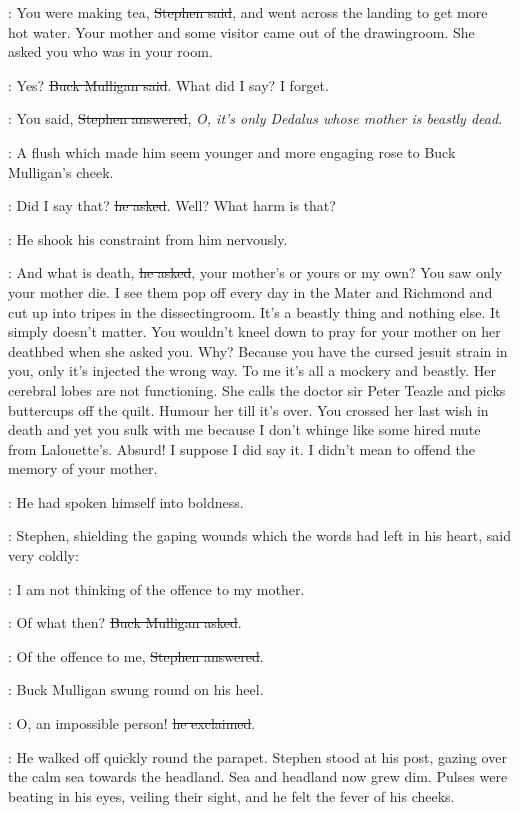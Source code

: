 \Stephen:
You were making tea,
\sout{Stephen said},
and went across the landing to get more hot water.
Your mother and some visitor came out of the drawingroom.
She asked you who was in your room.

\Mulligan:
Yes?
\sout{Buck Mulligan said}.
What did I say?
I forget.

\Stephen:
You said,
\sout{Stephen answered},
\emph{O, it's only Dedalus whose mother is beastly dead.}

:
A flush
which made him seem younger and more engaging
rose to Buck Mulligan's cheek.

\Mulligan:
Did I say that?
\sout{he asked}.
Well?
What harm is that?

:
He shook his constraint from him nervously.

\Mulligan:
And what is death,
\sout{he asked},
your mother's or yours or my own?
You saw only your mother die.
I see them pop off every day in the Mater and Richmond
and cut up into tripes in the dissectingroom.
It's a beastly thing and nothing else.
It simply doesn't matter.
You wouldn't kneel down to pray for your mother on her deathbed
when she asked you.
Why?
Because you have the cursed jesuit strain in you,
only it's injected the wrong way.
To me it's all a mockery and beastly.
Her cerebral lobes are not functioning.
She calls the doctor sir Peter Teazle
and picks buttercups off the quilt.
Humour her till it's over.
You crossed her last wish in death
and yet you sulk with me
because I don't whinge like some hired mute from Lalouette's.
Absurd!
I suppose I did say it.
I didn't mean to offend the memory of your mother.

:
He had spoken himself into boldness.

:
Stephen,
shielding the gaping wounds
which the words had left in his heart,
said very coldly:

\Stephen:
I am not thinking of the offence to my mother.

\Mulligan:
Of what then?
\sout{Buck Mulligan asked}.

\Stephen:
Of the offence to me,
\sout{Stephen answered}.

:
Buck Mulligan swung round on his heel.

\Mulligan:
O, an impossible person!
\sout{he exclaimed}.

:
He walked off quickly round the parapet.
Stephen stood at his post,
gazing over the calm sea towards the headland.
Sea and headland now grew dim.
Pulses were beating in his eyes,
veiling their sight,
and he felt the fever of his cheeks.

